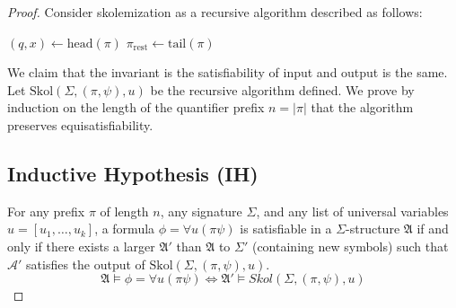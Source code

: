 \documentclass{article}
\begin{document}
\begin{proof}
    Consider skolemization as a recursive algorithm described as follows:\\
\begin{algorithm}[H]
    \caption{Skolemization on Prenex Formula}
    
    
    $(q, x) \gets \text{head}(\pi)$\;
    $\pi_{\text{rest}} \gets \text{tail}(\pi)$
    
\end{algorithm}
We claim that the invariant is the satisfiability of input and output is the same.
Let $\text{Skol}(\Sigma, (\pi, \psi), u)$ be the recursive algorithm defined. 
We prove by induction on the length of the quantifier prefix $n = |\pi|$ that the algorithm preserves equisatisfiability.

\subsection*{Inductive Hypothesis (IH)}
For any prefix $\pi$ of length $n$, any signature $\Sigma$, and any list of universal variables $u = [u_1, \dots, u_k]$, 
a formula $\phi = \forall u (\pi \psi)$ is satisfiable in a $\Sigma$-structure $\mathfrak{A}$ 
if and only if there exists a larger $\mathfrak{A}'$ than $\mathfrak{A}$ to $\Sigma'$ (containing new symbols) 
such that $\mathcal{A}'$ satisfies the output of $\text{Skol}(\Sigma, (\pi, \psi), u)$.
\[\mathfrak{A} \models \phi = \forall u (\pi \psi) \iff \mathfrak{A}' \models {Skol}(\Sigma, (\pi, \psi), u)\]


\end{proof}
\end{document}
